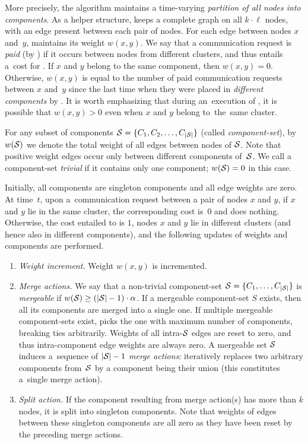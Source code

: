More precisely, the algorithm maintains a time-varying \emph{partition of all
nodes into components}. As a helper structure, \CREP keeps a complete graph on
all $k \cdot \ell$ nodes, with an edge present between each pair of nodes. For
each edge between nodes $x$ and~$y$, \CREP maintains its weight $w(x,y)$. We
say that a communication request is \emph{paid} (by \CREP) if it occurs
between nodes from different clusters, and thus entails a~cost for \CREP. If
$x$ and $y$ belong to the same component, then $w(x,y) = 0$. Otherwise,
$w(x,y)$ is equal to the number of paid communication requests between $x$
and~$y$ since the last time when they were placed in \emph{different components} 
by \CREP. It is worth emphasizing that during an~execution of \CREP, it is
possible that $w(x,y) > 0$ even when $x$ and $y$ belong to~the~same cluster.

For any subset of components $\mathcal{S} = \{ C_1, C_2, \ldots, C_{|\mathcal{S}|} \}$ (called
\emph{component-set}), by~$w(\mathcal{S})$ we denote the total weight of all edges
between nodes of $\mathcal{S}$. Note that positive weight edges occur only between
different components of~$\mathcal{S}$. We call a component-set \emph{trivial} if it
contains only one component; $w(\mathcal{S}) = 0$ in this case.

Initially, all components are singleton components and all edge weights are
zero. At time~$t$, upon a~communication request between a pair of nodes $x$
and $y$, if $x$ and $y$ lie in the same cluster, the corresponding cost is~$0$
and \CREP does nothing. Otherwise, the cost entailed to \CREP is $1$, nodes
$x$ and $y$ lie in different clusters (and hence also in different
components), and the following updates of weights and components are
performed.

\begin{enumerate}

\item \emph{Weight increment.} Weight $w(x,y)$ is incremented.

\item \emph{Merge actions.} We say that a non-trivial component-set $\mathcal{S} = \{
C_1, \ldots, C_{|\mathcal{S}|} \}$ is \emph{mergeable} if $w(\mathcal{S}) \geq
(|\mathcal{S}|-1) \cdot \alpha$. If a mergeable component-set $S$ exists, then all its
components are merged into a single one. If multiple mergeable component-sets
exist, \CREP picks the one with maximum number of components, breaking ties
arbitrarily. Weights of all intra-$\mathcal{S}$ edges are reset to zero, and thus
intra-component edge weights are always zero. A mergeable set $\mathcal{S}$ induces
a~sequence of $|\mathcal{S}|-1$ \emph{merge actions}:
\CREP iteratively replaces two arbitrary components 
from~$\mathcal{S}$ by a component being their union (this constitutes a~single merge
action).

\item \emph{Split action.} If the component resulting from merge action(s)
has more than $k$ nodes, it is split into singleton
components. Note that weights of edges between these singleton components are
all zero as they have been reset by the preceding merge actions.

\end{enumerate}

